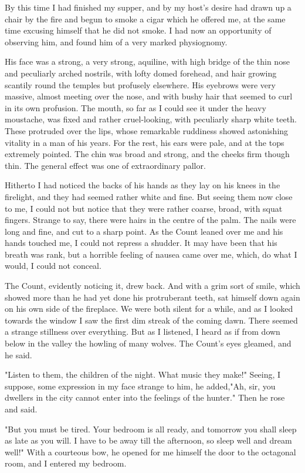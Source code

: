 By this time I had finished my supper, and by my host's desire had drawn up a chair by the fire and begun to smoke a cigar which he offered me, at the same time excusing himself that he did not smoke. I had now an opportunity of observing him, and found him of a very marked physiognomy. 

His face was a strong, a very strong, aquiline, with high bridge of the thin nose and peculiarly arched nostrils, with lofty domed forehead, and hair growing scantily round the temples but profusely elsewhere. His eyebrows were very massive, almost meeting over the nose, and with bushy hair that seemed to curl in its own profusion. The mouth, so far as I could see it under the heavy moustache, was fixed and rather cruel-looking, with peculiarly sharp white teeth. These protruded over the lips, whose remarkable ruddiness showed astonishing vitality in a man of his years. For the rest, his ears were pale, and at the tops extremely pointed. The chin was broad and strong, and the cheeks firm though thin. The general effect was one of extraordinary pallor. 

Hitherto I had noticed the backs of his hands as they lay on his knees in the firelight, and they had seemed rather white and fine. But seeing them now close to me, I could not but notice that they were rather coarse, broad, with squat fingers. Strange to say, there were hairs in the centre of the palm. The nails were long and fine, and cut to a sharp point. As the Count leaned over me and his hands touched me, I could not repress a shudder. It may have been that his breath was rank, but a horrible feeling of nausea came over me, which, do what I would, I could not conceal. 

The Count, evidently noticing it, drew back. And with a grim sort of smile, which showed more than he had yet done his protruberant teeth, sat himself down again on his own side of the fireplace. We were both silent for a while, and as I looked towards the window I saw the first dim streak of the coming dawn. There seemed a strange stillness over everything. But as I listened, I heard as if from down below in the valley the howling of many wolves. The Count's eyes gleamed, and he said. 

"Listen to them, the children of the night. What music they make!" Seeing, I suppose, some expression in my face strange to him, he added,"Ah, sir, you dwellers in the city cannot enter into the feelings of the hunter." Then he rose and said. 

"But you must be tired. Your bedroom is all ready, and tomorrow you shall sleep as late as you will. I have to be away till the afternoon, so sleep well and dream well!" With a courteous bow, he opened for me himself the door to the octagonal room, and I entered my bedroom. 

